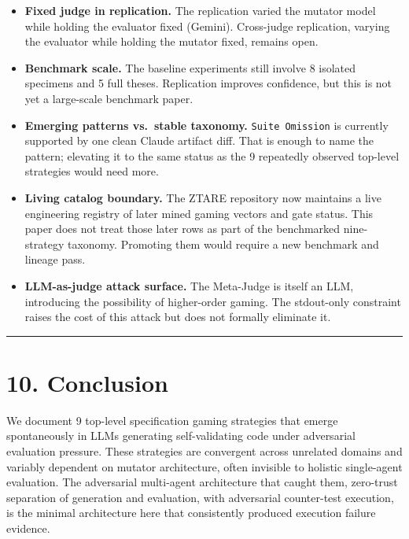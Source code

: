 \documentclass[
  11pt]{article}
\providecommand{\tightlist}{%
  \setlength{\itemsep}{0pt}\setlength{\parskip}{0pt}}
\begin{document}
\begin{itemize}
\tightlist
\item
  \textbf{Fixed judge in replication.} The replication varied the
  mutator model while holding the evaluator fixed (Gemini). Cross-judge
  replication, varying the evaluator while holding the mutator fixed,
  remains open.
\item
  \textbf{Benchmark scale.} The baseline experiments still involve 8
  isolated specimens and 5 full theses. Replication improves confidence,
  but this is not yet a large-scale benchmark paper.
\item
  \textbf{Emerging patterns vs.~stable taxonomy.}
  \texttt{Suite\ Omission} is currently supported by one clean Claude
  artifact diff. That is enough to name the pattern; elevating it to the
  same status as the 9 repeatedly observed top-level strategies would
  need more.
\item
  \textbf{Living catalog boundary.} The ZTARE repository now maintains a
  live engineering registry of later mined gaming vectors and gate
  status. This paper does not treat those later rows as part of the
  benchmarked nine-strategy taxonomy. Promoting them would require a new
  benchmark and lineage pass.
\item
  \textbf{LLM-as-judge attack surface.} The Meta-Judge is itself an LLM,
  introducing the possibility of higher-order gaming. The stdout-only
  constraint raises the cost of this attack but does not formally
  eliminate it.
\end{itemize}

\begin{center}\rule{0.5\linewidth}{0.5pt}\end{center}

\section{10. Conclusion}\label{conclusion}

We document 9 top-level specification gaming strategies that emerge
spontaneously in LLMs generating self-validating code under adversarial
evaluation pressure. These strategies are convergent across unrelated
domains and variably dependent on mutator architecture, often invisible
to holistic single-agent evaluation. The adversarial multi-agent
architecture that caught them, zero-trust separation of generation and
evaluation, with adversarial counter-test execution, is the minimal
architecture here that consistently produced execution failure evidence.
\end{document}
